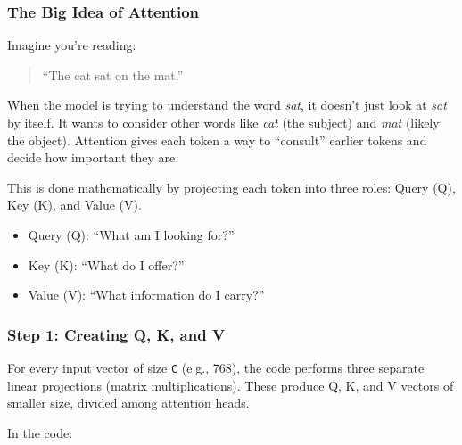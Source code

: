 \documentclass[
  letterpaper,
  DIV=11,
  numbers=noendperiod]{scrreprt}
\providecommand{\tightlist}{%
  \setlength{\itemsep}{0pt}\setlength{\parskip}{0pt}}
\begin{document}
\subsubsection{The Big Idea of
Attention}\label{the-big-idea-of-attention}

Imagine you're reading:

\begin{quote}
``The cat sat on the mat.''
\end{quote}

When the model is trying to understand the word \emph{sat}, it doesn't
just look at \emph{sat} by itself. It wants to consider other words like
\emph{cat} (the subject) and \emph{mat} (likely the object). Attention
gives each token a way to ``consult'' earlier tokens and decide how
important they are.

This is done mathematically by projecting each token into three roles:
Query (Q), Key (K), and Value (V).

\begin{itemize}
\tightlist
\item
  Query (Q): ``What am I looking for?''
\item
  Key (K): ``What do I offer?''
\item
  Value (V): ``What information do I carry?''
\end{itemize}

\subsubsection{Step 1: Creating Q, K, and
V}\label{step-1-creating-q-k-and-v}

For every input vector of size \texttt{C} (e.g., 768), the code performs
three separate linear projections (matrix multiplications). These
produce Q, K, and V vectors of smaller size, divided among attention
heads.

In the code:
\end{document}
